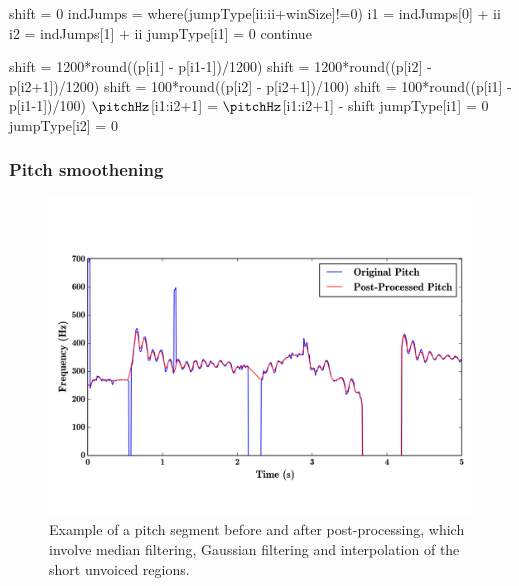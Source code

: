 {\begin{algorithm}
\begin{algorithmic}
						
		\State shift = 0
		\State indJumps = where(jumpType[ii:ii+winSize]!=0)			
						
		\State i1 = indJumps[0] + ii
		\State i2 = indJumps[1]	+ ii			
		\State jumpType[i1] = 0
		\State continue			
		\EndIf
		
		\State shift = 1200*round((p[i1] - p[i1-1])/1200)
		\State shift = 1200*round((p[i2] - p[i2+1])/1200)
		\State shift = 100*round((p[i2] - p[i2+1])/100)
		\State shift = 100*round((p[i1] - p[i1-1])/100)
		\EndIf
		\EndIf
		\EndIf
		\State $\pitchHz$[i1:i2+1] = $\pitchHz$[i1:i2+1] - shift
		\State jumpType[i1] = 0
		\State jumpType[i2] = 0		
		
		\EndFor
		
	\end{algorithmic}
\end{algorithm}


\subsubsection{Pitch smoothening}
\label{sec:data_processing_pitch_smoothening}


\begin{figure}
	\begin{center}
		\includegraphics[width=\figSizeHundred]{ch05_preprocessing/figures/smootheningExample.png}
	\end{center}
	\caption{Example of a pitch segment before and after post-processing, which involve median filtering, Gaussian filtering and interpolation of the short unvoiced regions.}
	\label{fig:smoothening_example}
\end{figure}

}
